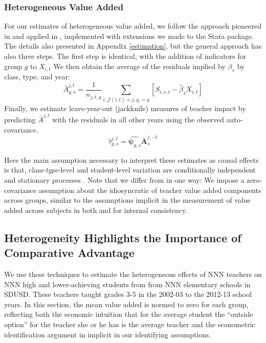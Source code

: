 \documentclass[12pt]{article}
\theoremstyle{definition}
\theoremstyle{definition}
\theoremstyle{definition}
\theoremstyle{definition}
\begin{document}
\subsubsection{Heterogeneous Value Added}

For our estimates of heterogeneous value added, we follow the approach pioneered in \citet{Delgado2020} and applied in \citet{bates2022teacher}, implemented with extensions we made to the \citet{vam_stata_ado} Stata package. The details also presented in Appendix \ref{estimation}, but the general approach has also three steps. The first step is identical, with the addition of indicators for group $g$ to $X_{i,t}$ We then obtain the average of the residuals implied by $\beta_s$ by class, type, and year:
\begin{equation}
\bar{A}^{j,t}_{g,s} = \frac{1}{n_{j,t,g}} \sum_{i:\mathcal{J}(i,t) = j,g_i=g} \left [ S_{i,s,t} - \hat{\beta}_s X_{i,t} \right ]\nonumber
\end{equation}
\noindent Finally, we estimate leave-year-out (jackknife) measures of teacher impact by predicting $\bar{A}^{j,t}$ with the residuals in all other years using the observed auto-covariance.  %
\begin{equation}
\hat{\tau}^{j,t}_{g,s} = \hat{\bm{\psi}_{g,s}} \bar{\bm{A}}^{j,-t}_s
\end{equation}

Here the main assumption necessary to interpret these estimates as causal effects is that, class-\textit{type}-level and student-level variation are conditionally independent and stationary processes \citep[as derrived in][---again formal details are in Appendix \ref{estimation}]{Delgado2020}. Note that we differ from \cite{Delgado2020} in one way: We impose a zero-covariance assumption about the idiosyncratic of teacher value added components across groups, similar to the assumptions implicit in the measurement of value added across subjects in both \citet{chetty2014measuring1} and \citet{Delgado2020} for internal consistency.


\subsection{Heterogeneity Highlights the Importance of Comparative Advantage} \label{va_results}

We use these techniques to estimate the heterogeneous effects of NNN teachers on NNN high and lower-achieving students from from NNN elementary schools in SDUSD. These teachers taught grades 3-5 in the 2002-03 to the 2012-13 school years. In this section, the mean value added is normed to zero for each group, reflecting both the economic intuition that for the average student the ``outside option'' for the teacher she or he has is the average teacher and the econometric identification argument in \citet{chetty2014measuring1} implicit in our identifying assumptions.
\end{document}
